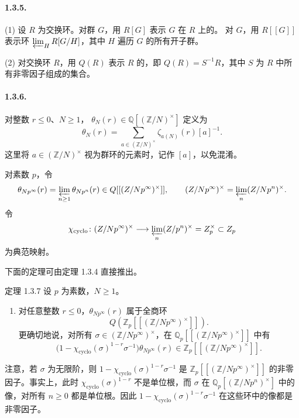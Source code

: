 \paragraph{1.3.5.}
(1) 设 $R$ 为交换环。对群 $G$，用 $R[G]$ 表示 $G$ 在 $R$ 上的。
对 $G$，用 $R[[G]]$ 表示环 $\varprojlim_HR[G/H]$，其中 $H$ 遍历 $G$ 的所有开子群。

(2) 对交换环 $R$，用 $Q(R)$ 表示 $R$ 的，即 $Q(R)=S^{-1}R$，其中 $S$ 为 $R$ 中所有非零因子组成的集合。

\paragraph{1.3.6.}
对整数 $r\leq0$、$N\geq1$， $\theta_N(r)\in\mathbb Q[(\mathbb Z/N)^\times]$ 定义为
\[
\theta_N(r)=\sum_{a\in(\mathbb Z/N)^\times}\zeta_{a(N)}(r)[a]^{-1}.
\]
这里将 $a\in(\mathbb Z/N)^\times$ 视为群环的元素时，记作 $[a]$，以免混淆。

对素数 $p$，令
\[
\theta_{Np^\infty}(r)=\varprojlim_{n\geq1}\theta_{Np^n}(r)
\in\mathbb Q[[(\mathbb Z/Np^\infty)^\times]],
\qquad
(\mathbb Z/Np^\infty)^\times=\varprojlim_n(\mathbb Z/Np^n)^\times.
\]
令
\[
\chi_{\mathrm{cyclo}}\colon(\mathbb Z/Np^\infty)^\times
\longrightarrow\varprojlim_n(\mathbb Z/p^n)^\times
=\mathbb Z_p^\times\subset\mathbb Z_p
\]
为典范映射。

下面的定理可由定理 1.3.4 直接推出。
\begin{statement}{定理 1.3.7}
设 $p$ 为素数，$N\geq1$。
\begin{enumerate}[label=(\arabic*)]
\item 对任意整数 $r\leq0$，$\theta_{Np^\infty}(r)$ 属于全商环
\[Q(\mathbb Z_p[[(\mathbb Z/Np^\infty)^\times]]).\]
更确切地说，对所有
$\sigma\in(\mathbb Z/Np^\infty)^\times$，在
$\mathbb Q_p[[(\mathbb Z/Np^\infty)^\times]]$ 中有
\[
\bigl(1-\chi_{\mathrm{cyclo}}(\sigma)^{1-r}\sigma^{-1}\bigr)
\theta_{Np^\infty}(r)\in\mathbb Z_p[[(\mathbb Z/Np^\infty)^\times]].
\]
\end{enumerate}
\end{statement}
注意，若 $\sigma$ 为无限阶，则 $1-\chi_{\mathrm{cyclo}}(\sigma)^{1-r}\sigma^{-1}$ 是
$\mathbb Z_p[[(\mathbb Z/Np^\infty)^\times]]$ 的非零因子。事实上，此时
$\chi_{\mathrm{cyclo}}(\sigma)^{1-r}$ 不是单位根，而 $\sigma$ 在
$\mathbb Q_p[(\mathbb Z/Np^n)^\times]$ 中的像，对所有 $n\geq0$ 都是单位根。因此
$1-\chi_{\mathrm{cyclo}}(\sigma)^{1-r}\sigma^{-1}$ 在这些环中的像都是非零因子。

